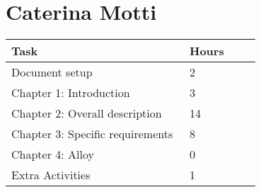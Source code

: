\section{Caterina Motti}
\begin{center}
	\begin{tabular}{@{}p{0.5\linewidth} p{0.2\linewidth}@{}}
		\hline
		\textbf{Task} & \textbf{Hours} \\ \hline
            Document setup & 2 \\ \hline
            Chapter 1: Introduction & 3 \\ \hline
            Chapter 2: Overall description & 14 \\ \hline
            Chapter 3: Specific requirements & 8 \\ \hline
            Chapter 4: Alloy & 0 \\ \hline
	    Extra Activities & 1 \\ \hline
	\end{tabular}
\end{center}

